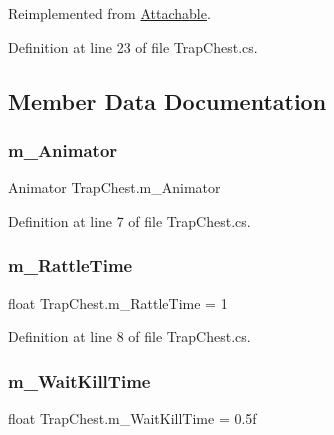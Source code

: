 Reimplemented from \mbox{\hyperlink{class_attachable_abb659a66efacd6fa09fa1d7125c7b5e6}{Attachable}}.



Definition at line 23 of file Trap\+Chest.\+cs.



\subsection{Member Data Documentation}
\mbox{\label{class_trap_chest_ad7ab3a3b4c3d686726939377497ccc9b}} 
\subsubsection{\texorpdfstring{m\+\_\+\+Animator}{m\_Animator}}
{\footnotesize\ttfamily Animator Trap\+Chest.\+m\+\_\+\+Animator}



Definition at line 7 of file Trap\+Chest.\+cs.

\mbox{\label{class_trap_chest_a42d826ae35440fd2fb88e0fc9ff02751}} 
\subsubsection{\texorpdfstring{m\+\_\+\+Rattle\+Time}{m\_RattleTime}}
{\footnotesize\ttfamily float Trap\+Chest.\+m\+\_\+\+Rattle\+Time = 1}



Definition at line 8 of file Trap\+Chest.\+cs.

\mbox{\label{class_trap_chest_adcdef4147a8944ffd1e8012b837a2b5e}} 
\subsubsection{\texorpdfstring{m\+\_\+\+Wait\+Kill\+Time}{m\_WaitKillTime}}
{\footnotesize\ttfamily float Trap\+Chest.\+m\+\_\+\+Wait\+Kill\+Time = 0.\+5f}



